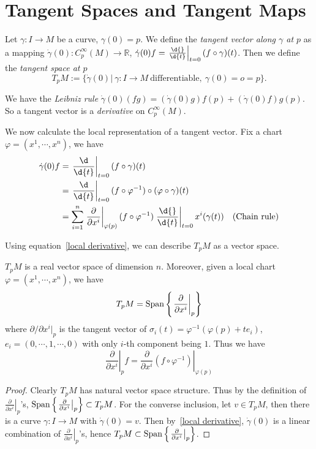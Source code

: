 \section{Tangent Spaces and Tangent Maps}

\begin{defn}
    Let $\gamma:I\to M$ be a curve, $\gamma(0)=p$.
    We define the \emph{tangent vector along $\gamma$ at $p$} as a mapping $\dot{\gamma}(0):C^\infty_p(M)\to\mathbb{R}$, $\dot{\gamma}(0)f=\left.\frac{\d{}}{\d{t}}\right|_{t=0}(f\circ\gamma)(t)$.
    Then we define the \emph{tangent space at $p$}
    \[T_pM:=\{\dot{\gamma}(0)|\ \gamma:I\to M\ \text{differentiable},\ \gamma(0)=o=p\}.\]
\end{defn}

\begin{prop}
    We have the \emph{Leibniz rule} $\dot{\gamma}(0)(fg)=(\dot{\gamma}(0)g)f(p)+(\dot{\gamma}(0)f)g(p)$.
    So a tangent vector is a \emph{derivative} on $C^\infty_p(M)$.
\end{prop}

We now calculate the local representation of a tangent vector.
Fix a chart $\varphi=(x^1,\cdots,x^n)$, we have
\begin{equation}
    \begin{aligned}
        \dot{\gamma}(0)f&=\left.\frac{\d}{\d{t}}\right|_{t=0}(f\circ\gamma)(t)\\
        &=\left.\frac{\d}{\d{t}}\right|_{t=0}(f\circ\varphi^{-1})\circ(\varphi\circ\gamma)(t)\\
        &=\sum_{i=1}^n\left.\frac{\partial{}}{\partial{x^i}}\right|_{\varphi(p)}(f\circ\varphi^{-1})\left.\frac{\d{}}{\d{t}}\right|_{t=0}x^i(\gamma(t))\quad\text{(Chain rule)}
    \end{aligned}\label{local derivative}
\end{equation}

Using equation~\eqref{local derivative}, we can describe $T_pM$ as a vector space.
\begin{prop}
    $T_pM$ is a real vector space of dimension $n$.
    Moreover, given a local chart $\varphi=(x^1,\cdots,x^n)$, we have
    \[T_pM=\operatorname{Span}\left\{\left.\frac{\partial{}}{\partial{x^i}}\right|_p\right\}\]
    where $\partial{}/\partial{x^i}|_p$ is the tangent vector of $\sigma_i(t)=\varphi^{-1}(\varphi(p)+te_i)$, $e_i=(0,\cdots,1,\cdots,0)$ with only $i$-th component being $1$.
    Thus we have
    \[\left.\frac{\partial{}}{\partial{x^i}}\right|_pf=\left.\frac{\partial{}}{\partial{x^i}}(f\circ\varphi^{-1})\right|_{\varphi(p)}\]
\end{prop}
\begin{proof}
    Clearly $T_pM$ has natural vector space structure.
    Thus by the definition of $\left.\frac{\partial{}}{\partial{x^i}}\right|_p$'s, $\operatorname{Span}\left\{\left.\frac{\partial{}}{\partial{x^i}}\right|_p\right\}\subset T_pM$.
    For the converse inclusion, let $v\in T_pM$, then there is a curve $\gamma:I\to M$ with $\dot{\gamma}(0)=v$.
    Then by~\eqref{local derivative}, $\dot{\gamma}(0)$ is a linear combination of $\left.\frac{\partial{}}{\partial{x^i}}\right|_p$'s, hence $T_pM\subset\operatorname{Span}\left\{\left.\frac{\partial{}}{\partial{x^i}}\right|_p\right\}$.
\end{proof}

